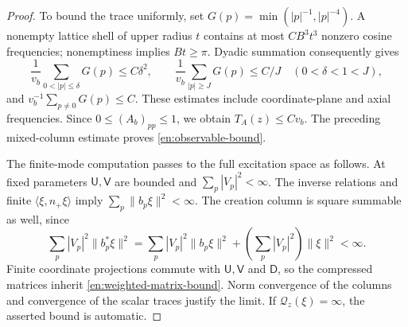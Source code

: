 \begin{proof}
To bound the trace uniformly, set
$G(p)=\min(|p|^{-1},|p|^{-4})$.  A nonempty lattice shell of upper
radius $t$ contains at most $CB^3t^3$ nonzero cosine frequencies;
nonemptiness implies $Bt\ge\pi$.  Dyadic summation consequently gives
\begin{equation}\label{en:lattice-tails}
 \frac1{v_b}\sum_{0<|p|\le\delta}G(p)\le C\delta^2,
 \qquad
 \frac1{v_b}\sum_{|p|\ge J}G(p)\le C/J
 \quad(0<\delta<1<J),
\end{equation}
and $v_b^{-1}\sum_{p\ne0}G(p)\le C$.  These estimates include
coordinate-plane and axial frequencies.  Since $0\le(A_b)_{pp}\le1$,
we obtain $T_A(z)\le Cv_b$.  The preceding mixed-column estimate
proves \eqref{en:observable-bound}.

The finite-mode computation passes to the full excitation space as
follows.  At fixed parameters $\mathsf U,\mathsf V$ are bounded and
$\sum_p|V_p|^2<\infty$.  The inverse relations and finite
$\langle\xi,n_+\xi\rangle$ imply
$\sum_p\|b_p\xi\|^2<\infty$.  The creation column is square summable
as well, since
\[
 \sum_p|V_p|^2\|b_p^*\xi\|^2
   =\sum_p|V_p|^2\|b_p\xi\|^2
       +\left(\sum_p|V_p|^2\right)\|\xi\|^2<\infty.
\]
Finite coordinate projections commute with $\mathsf U,\mathsf V$
and $\mathsf D$, so the compressed matrices inherit
\eqref{en:weighted-matrix-bound}.  Norm convergence of the columns
and convergence of the scalar traces justify the limit.  If
$\mathcal Q_z(\xi)=\infty$, the asserted bound is automatic.
\end{proof}


